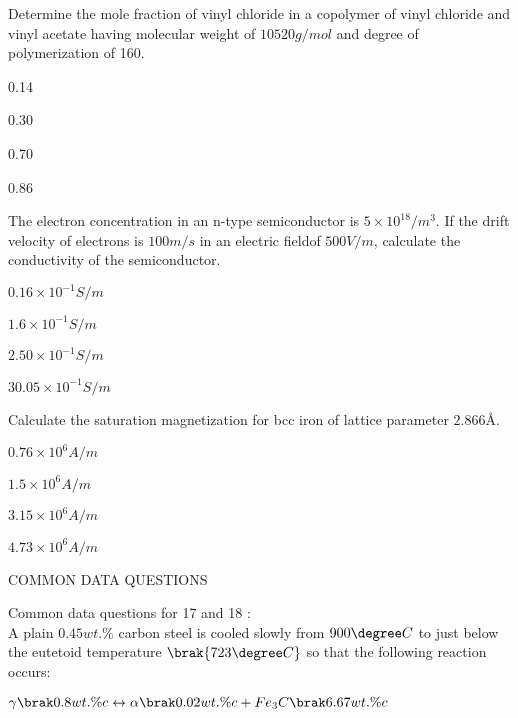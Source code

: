 Determine the mole fraction of vinyl chloride in a copolymer of vinyl chloride  and vinyl acetate  having molecular weight of $10520 g/mol$ and degree of polymerization of 160. 
\begin{enumerate}
\begin{multicols}{4}
\item 0.14
\item 0.30
\item 0.70 
\item 0.86
\end{multicols}
\end{enumerate}
\item %
The electron concentration in an n-type semiconductor is $5 \times 10^{18}/m^3$. If the drift velocity of electrons is $100m/s$ in an electric fieldof $500V/m $, calculate the conductivity of the semiconductor.
\begin{enumerate}
\begin{multicols}{4}
\item $0.16 \times 10^{-1} S/m$
\item $1.6 \times 10^{-1} S/m$
\item $2.50 \times 10^{-1} S/m$
\item $30.05 \times 10^{-1} S/m$
\end{multicols}
\end{enumerate}
\item %
Calculate the saturation magnetization  for bcc iron of lattice parameter $2.866 \text{\AA} $. 
\begin{enumerate}
\begin{multicols}{4}
\item $0.76 \times 10^6 A/m$
\item $1.5 \times 10^6 A/m$
\item $3.15 \times 10^6 A/m$
\item $4.73 \times 10^6 A/m$
\end{multicols}
\end{enumerate}
\begin{center}
 COMMON DATA QUESTIONS
\end{center}
Common data questions for 17 and 18 :\\
A plain $0.45 wt.\% $ carbon steel is cooled slowly from $900 \degree C$ to just below the eutetoid temperature $\brak{723 \degree C}$ so that the following reaction occurs: 
\begin{center}
    $\gamma \brak{0.8 wt.\% c} \leftrightarrow \alpha \brak{0.02 wt.\% c} + Fe_3C\brak{6.67 wt.\% c}$
\end{center}
